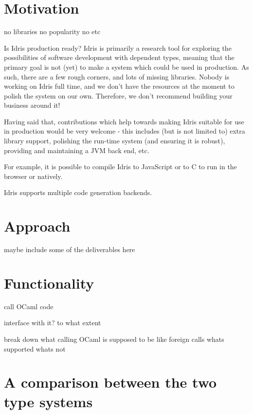 \section{Motivation}
no libraries no popularity no etc

Is Idris production ready?
Idris is primarily a research tool for exploring the possibilities of software development with dependent types, meaning that the primary goal is not (yet) to make a system which could be used in production. As such, there are a few rough corners, and lots of missing libraries. Nobody is working on Idris full time, and we don’t have the resources at the moment to polish the system on our own. Therefore, we don’t recommend building your business around it!

Having said that, contributions which help towards making Idris suitable for use in production would be very welcome - this includes (but is not limited to) extra library support, polishing the run-time system (and ensuring it is robust), providing and maintaining a JVM back end, etc.


For example, it is possible to compile Idris to JavaScript or to C
to run in the browser or natively. 

Idris supports multiple code generation backends.

\section{Approach}

maybe include some of the deliverables here

\section{Functionality}

call OCaml code

interface with it? to what extent

break down what calling OCaml is supposed to be like
foreign calls whats supported whats not

\section{A comparison between the two type systems}
